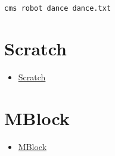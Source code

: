 \begin{verbatim}
cms robot dance dance.txt
\end{verbatim}

\section{Scratch}\label{scratch}

\begin{itemize}
\tightlist
\item
  \href{https://scratch.mit.edu/scratchr2/static/sa/Scratch-456.0.2.dmg}{Scratch}
\end{itemize}

\section{MBlock}\label{mblock}

\begin{itemize}
\tightlist
\item
  \href{http://www.mblock.cc/download/}{MBlock}
\end{itemize}
